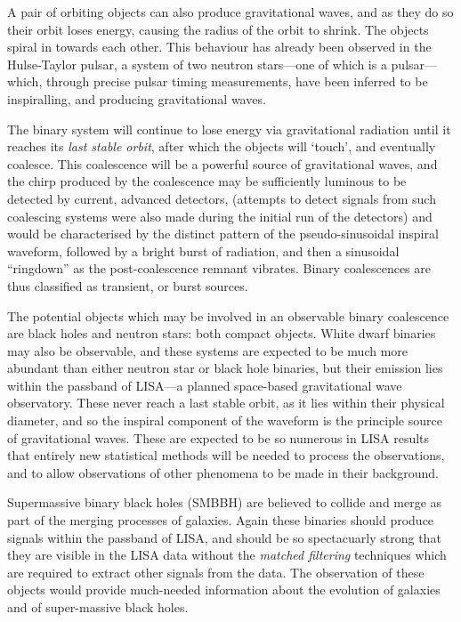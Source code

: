 
A pair of orbiting objects can also produce gravitational waves, and
as they do so their orbit loses energy, causing the radius of the
orbit to shrink. The objects spiral in towards each other. This
behaviour has already been observed in the Hulse-Taylor
pulsar\cite{1975ApJ...195L..51H}\cite{2005ASPC..328...25W}, a system
of two neutron stars---one of which is a pulsar--- which, through
precise pulsar timing measurements, have been inferred to be
inspiralling, and producing gravitational waves.

The binary system will continue to lose energy via gravitational
radiation until it reaches its \emph{last stable orbit}, after which
the objects will `touch', and eventually coalesce. This coalescence
will be a powerful source of gravitational waves, and the chirp
produced by the coalescence may be sufficiently luminous to be
detected by current, advanced detectors, (attempts to detect signals
from such coalescing systems were also made during the initial run of
the detectors\cite{2012PhRvD..85h2002A}) and would be characterised by
the distinct pattern of the pseudo-sinusoidal inspiral waveform,
followed by a bright burst of radiation, and then a sinusoidal
``ringdown'' as the post-coalescence remnant
vibrates\cite{2009LRR....12....2S}. Binary coalescences are thus
classified as transient, or burst sources.

The potential objects which may be involved in an observable binary
coalescence are black holes and neutron stars: both compact
objects. White dwarf binaries may also be observable, and these
systems are expected to be much more abundant than either neutron star
or black hole binaries, but their emission lies within the passband of
LISA---a planned space-based gravitational wave observatory. These
never reach a last stable orbit, as it lies within their physical
diameter, and so the inspiral component of the waveform is the
principle source of gravitational waves. These are expected to be so
numerous in LISA results\cite{2013GWN.....6....4A} that entirely new statistical methods will be
needed to process the observations, and to allow observations of other
phenomena to be made in their background.

Supermassive binary black holes (SMBBH) are believed to collide and
merge as part of the merging processes of galaxies. Again these
binaries should produce signals within the passband of LISA\cite{2012CQGra..29l4016A}, and
should be so spectacuarly strong that they are visible in the LISA
data without the \emph{matched filtering} techniques which are
required to extract other signals from the data\cite{2009LRR....12....2S}. The observation of
these objects would provide much-needed information about the
evolution of galaxies and of super-massive black holes.

